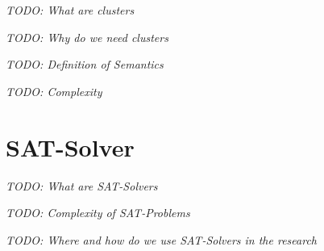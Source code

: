 \textit{TODO: What are clusters}

\textit{TODO: Why do we need clusters}

\textit{TODO: Definition of Semantics}

\textit{TODO: Complexity}


\section{SAT-Solver}

\textit{TODO: What are SAT-Solvers}

\textit{TODO: Complexity of SAT-Problems}

\textit{TODO: Where and how do we use SAT-Solvers in the research}

